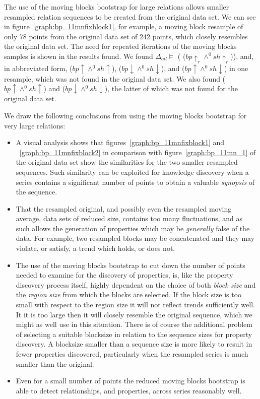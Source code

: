 The use of the moving blocks bootstrap for large relations allows
smaller resampled relation sequences to be created from the original data set. 
We can see in figure~\ref{graph:bp_11mnfixblock1}, for example,
a moving block resample of only 78 points from the original data set
of 242 points, which closely resembles the original data set. The need
for repeated iterations of the moving blocks samples is shown in the
results found. We found $\Delta_{oil} \models$ (
($bp \uparrow_r \wedge^0  sh \uparrow_r$)), and, in abbreviated form,  ($bp \uparrow \wedge^0
sh \uparrow$),  ($bp \downarrow \wedge^0
sh \downarrow$), and  ($bp \uparrow \wedge^0
sh \downarrow$) in one resample, which was not found in the original data
set. We also found  ($bp \uparrow \wedge^0
sh \uparrow$) and  ($bp \downarrow \wedge^0
sh \downarrow$), the latter of which was not found for the original
data set.

\medskip

We draw the following conclusions from using the moving blocks
bootstrap for very large relations:
\begin{itemize}
\item A visual analysis shows that figures~\ref{graph:bp_11mnfixblock1} and
~\ref{graph:bp_11mnfixblock2} in comparison with
figure~\ref{graph:bp_11mn_1} of the original data set show the
similarities for the two smaller resampled sequences. Such similarity can be 
exploited for knowledge discovery when a series contains a significant
number of points to obtain a valuable {\em synopsis} of the sequence.
\item That the resampled original, and possibly even the resampled
moving average, data sets of reduced size, contains too many fluctuations, and as such allows the
generation of properties which may be {\em generally} false of the
data. For example, two resampled blocks may be concatenated and they
may violate, or satisfy, a trend which holds, or does not.
\item The use of the moving blocks bootstrap to cut down the number of
points needed to examine for the discovery of properties, is, like the
property discovery process itself, highly dependent on the choice of
both {\em block size} and the {\em region size} from which the blocks
are selected. If the block size is too small with respect to the
region size it will not reflect trends sufficiently well. It it is too
large then it will closely resemble the original sequence, which we
might as well use in this situation. There is of course the additional
problem of selecting a suitable blocksize in relation to the sequence
sizes for property discovery. A blocksize smaller than a sequence size
is more likely to result in fewer properties discovered, particularly
when the resampled series is much smaller than the original.
\item Even for a small number of points the reduced moving blocks
bootstrap is able to detect relationships, and properties, across
series reasonably well.
\end{itemize}

